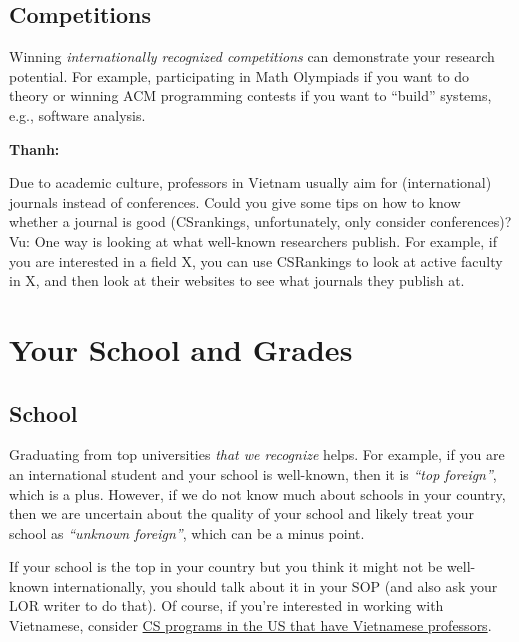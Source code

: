 \documentclass[oneside,11pt,dvipsnames]{book}
\newenvironment{commentbox}[1][]{
  \small
  \begin{mybox}
    {\small \textbf{#1}}
  }{
  \end{mybox}
}
\begin{document}
\subsection{Competitions} Winning \emph{internationally recognized competitions} can demonstrate your research potential.
For example, participating in Math Olympiads if you want to do theory or winning ACM programming contests if you want to ``build'' systems, e.g., software analysis.

\begin{commentbox}[Thanh:]
  Due to academic culture, professors in Vietnam usually aim for (international) journals instead of conferences. Could you give some tips on how to know whether a journal is good (CSrankings, unfortunately, only consider conferences)?
  \tcblower
  Vu: One way is looking at what well-known researchers publish. For example, if you are interested in a field X, you can use CSRankings to look at active faculty in X, and then look at their websites to see what journals they publish at.
\end{commentbox}


\section{Your School and Grades}\label{sec:your-school}

\subsection{School} Graduating from top universities \emph{that we recognize} helps. For example, if you are an international student and your school is well-known, then it is \emph{``top foreign''}, which is a plus.
However, if we do not know much about schools in your country, then we are uncertain about the quality of your school and likely treat your school as \emph{``unknown foreign''}, which can be a minus point.


If your school is the top in your country but you think it might not be well-known internationally, you should talk about it in your SOP (and also ask your LOR writer to do that). Of course, if you're interested in working with Vietnamese, consider  \href{https://github.com/dynaroars/dynaroars.github.io/wiki/Viet-CS-Profs-US}{CS programs in the US that have Vietnamese professors}. %
\end{document}
